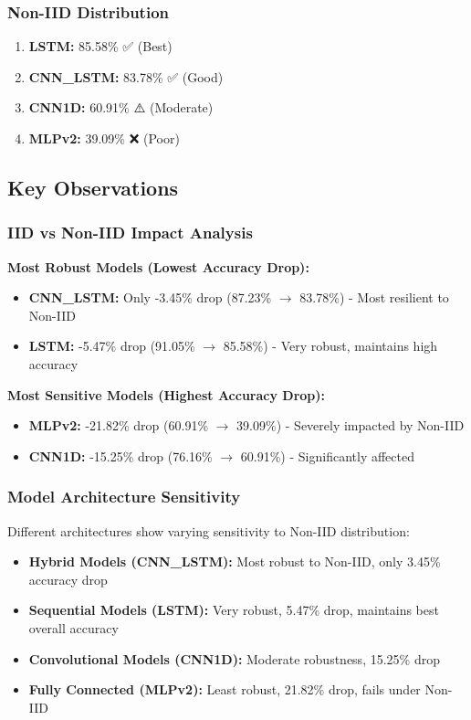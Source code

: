\documentclass[12pt,a4paper]{article}
\begin{document}
\subsubsection{Non-IID Distribution}

\begin{enumerate}
    \item \textbf{LSTM:} 85.58\% ✅ (Best)
    \item \textbf{CNN\_LSTM:} 83.78\% ✅ (Good)
    \item \textbf{CNN1D:} 60.91\% ⚠️ (Moderate)
    \item \textbf{MLPv2:} 39.09\% ❌ (Poor)
\end{enumerate}

\subsection{Key Observations}

\subsubsection{IID vs Non-IID Impact Analysis}

\textbf{Most Robust Models (Lowest Accuracy Drop):}
\begin{itemize}
    \item \textbf{CNN\_LSTM:} Only -3.45\% drop (87.23\% $\rightarrow$ 83.78\%) - Most resilient to Non-IID
    \item \textbf{LSTM:} -5.47\% drop (91.05\% $\rightarrow$ 85.58\%) - Very robust, maintains high accuracy
\end{itemize}

\textbf{Most Sensitive Models (Highest Accuracy Drop):}
\begin{itemize}
    \item \textbf{MLPv2:} -21.82\% drop (60.91\% $\rightarrow$ 39.09\%) - Severely impacted by Non-IID
    \item \textbf{CNN1D:} -15.25\% drop (76.16\% $\rightarrow$ 60.91\%) - Significantly affected
\end{itemize}

\subsubsection{Model Architecture Sensitivity}

Different architectures show varying sensitivity to Non-IID distribution:

\begin{itemize}
    \item \textbf{Hybrid Models (CNN\_LSTM):} Most robust to Non-IID, only 3.45\% accuracy drop
    \item \textbf{Sequential Models (LSTM):} Very robust, 5.47\% drop, maintains best overall accuracy
    \item \textbf{Convolutional Models (CNN1D):} Moderate robustness, 15.25\% drop
    \item \textbf{Fully Connected (MLPv2):} Least robust, 21.82\% drop, fails under Non-IID
\end{itemize}
\end{document}
